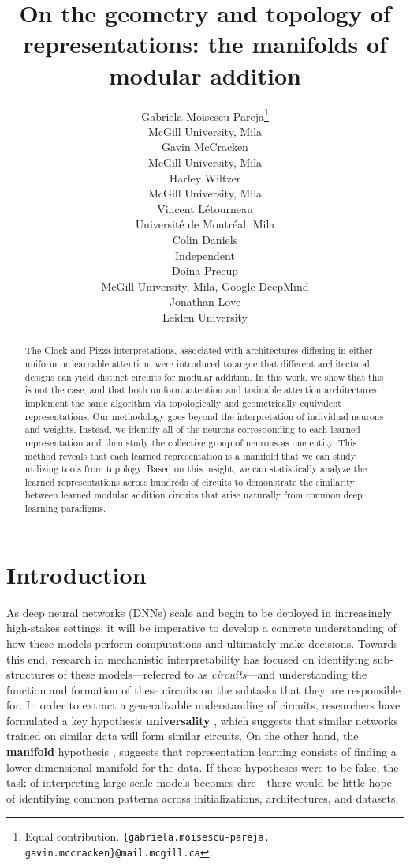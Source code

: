 \documentclass{article} %
\title{On the geometry and topology of representations: the manifolds of modular addition}
\author{%
  Gabriela Moisescu-Pareja\thanks{Equal contribution. \texttt{\{gabriela.moisescu‑pareja, gavin.mccracken\}@mail.mcgill.ca}} \\
  McGill University, Mila\\
   \And
   Gavin McCracken\footnotemark[\value{footnote}] \\
   McGill University, Mila \\
   \And
   Harley Wiltzer \\
   McGill University, Mila \\
   \AND
   Vincent Létourneau \\
   Université de Montréal, Mila \\
   \And
   Colin Daniels \\
   Independent \\
   \And
   Doina Precup \\
   McGill University, Mila, Google DeepMind \\
   \And
   Jonathan Love \\
   Leiden University \\
}
\theoremstyle{plain}
\theoremstyle{definition}
\newtheorem{empirical fact}[theorem]{Empirical Fact}
\begin{document}
\iclrfinalcopy


\maketitle

\begin{abstract}
The Clock and Pizza interpretations, associated with architectures differing in either uniform or learnable attention, were introduced to argue that different architectural designs can yield distinct circuits for modular addition.
In this work, we show that this is not the case, and that both uniform attention and trainable attention architectures implement the same algorithm via topologically and geometrically equivalent representations.
Our methodology goes beyond the interpretation of individual neurons and weights.
Instead, we identify all of the neurons corresponding to each learned representation and then study the collective group of neurons as one entity.
This method reveals that each learned representation is a manifold that we can study utilizing tools from topology.
Based on this insight, we can statistically analyze the learned representations across hundreds of circuits to demonstrate the similarity between learned modular addition circuits that arise naturally from common deep learning paradigms.


\end{abstract}


\section{Introduction}
As deep neural networks (DNNs) scale and begin to be deployed in increasingly high-stakes settings, it will be imperative to develop a concrete understanding of how these models perform computations and ultimately make decisions.
Towards this end, research in mechanistic interpretability has focused on identifying sub-structures of these models---referred to as \emph{circuits}---and understanding the function and formation of these circuits on the subtasks that they are responsible for.
In order to extract a generalizable understanding of circuits, researchers have formulated a key hypothesis \textbf{universality} \citep{li2015convergent, olah2020zoom}, which suggests that similar networks trained on similar data will form similar circuits. On the other hand, the \textbf{manifold} hypothesis \citep{bengio2013representation, goodfellow2016deep}, suggests that representation learning consists of finding a lower-dimensional manifold for the data. If these hypotheses were to be false, the task of interpreting large scale models becomes dire---there would be little hope of identifying common patterns across initializations, architectures, and datasets.
\end{document}
